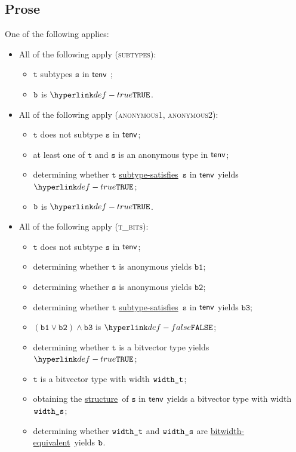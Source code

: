 \documentclass{book}
\newcommand\ProseOrTypeError[0]{\ProseTerminateAs{\TypeErrorConfig}}
\newcommand\structure[0]{\hyperlink{def-structure}{structure}}
\newcommand\subtypesatisfies[0]{\hyperlink{def-subtypesatisfies}{subtype-satisfies}}
\newcommand\bitwidthequivalent[0]{\hyperlink{def-bitwidthequal}{bitwidth-equivalent}}
\newcommand\vt[0]{\texttt{t}}
\newcommand\vs[0]{\texttt{s}}
\newcommand\vbone[0]{\texttt{b1}}
\newcommand\vbtwo[0]{\texttt{b2}}
\newcommand\vbthree[0]{\texttt{b3}}
\begin{document}
\subsection{Prose}
One of the following applies:
 \begin{itemize}
  \item All of the following apply (\textsc{subtypes}):
    \begin{itemize}
    \item $\vt$ subtypes $\vs$ in $\textsf{tenv}$ ;
    \item $\texttt{b}$ is $\True$.
  \end{itemize}

  \item All of the following apply (\textsc{anonymous1}, \textsc{anonymous2}):
  \begin{itemize}
    \item $\vt$ does not subtype $\vs$ in $\textsf{tenv}$;
    \item at least one of $\vt$ and $\vs$ is an anonymous type in $\textsf{tenv}$;
    \item determining whether $\vt$ \subtypesatisfies\ $\vs$ in $\textsf{tenv}$ yields $\True$\ProseOrTypeError;
    \item $\texttt{b}$ is $\True$.
  \end{itemize}

  \item All of the following apply (\textsc{t\_bits}):
  \begin{itemize}
    \item $\vt$ does not subtype $\vs$ in $\textsf{tenv}$;
    \item determining whether $\vt$ is anonymous yields $\vbone$;
    \item determining whether $\vs$ is anonymous yields $\vbtwo$;
    \item determining whether $\vt$ \subtypesatisfies\ $\vs$ in $\textsf{tenv}$ yields $\vbthree$;
    \item $(\vbone \lor \vbtwo) \land \vbthree$ is $\False$;
    \item determining whether $\vt$ is a bitvector type yields $\True$\ProseOrTypeError;
    \item $\vt$ is a bitvector type with width $\texttt{width\_t}$;
    \item obtaining the \structure\ of $\vs$ in $\textsf{tenv}$ yields a bitvector type with width \\
          $\texttt{width\_s}$\ProseOrTypeError;
    \item determining whether $\texttt{width\_t}$ and $\texttt{width\_s}$ are \bitwidthequivalent\ yields $\texttt{b}$.
  \end{itemize}


\end{itemize}
\end{document}
